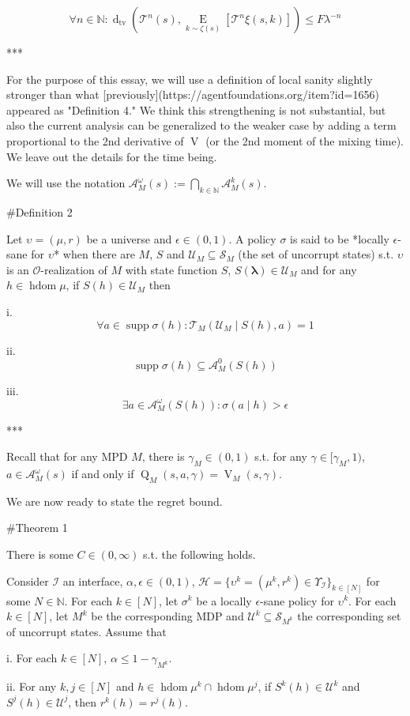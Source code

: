 \documentclass[a4paper]{article}
\DeclareMathOperator{\Supp}{supp}
\newcommand{\AP}[1]{\left(#1\right)}
\newcommand{\AB}[1]{\left[#1\right]}
\newcommand{\Ea}[2]{\underset{#1}{\operatorname{E}}\AB{#2}}
\newcommand{\Dtva}[1]{\operatorname{d}_{\text{tv}}\AP{#1}}
\newcommand{\Nats}{\mathbb{N}}
\newcommand{\Estr}{\boldsymbol{\lambda}}
\newcommand{\Ob}{\mathcal{O}}
\newcommand{\A}{\mathcal{A}}
\newcommand{\St}{\mathcal{S}}
\newcommand{\T}{\mathcal{T}}
\newcommand{\In}{\mathcal{I}}
\DeclareMathOperator{\HD}{hdom}
\newcommand{\Hy}{\mathcal{H}}
\newcommand{\UC}{\mathcal{U}}
\newcommand{\V}{\operatorname{V}}
\newcommand{\Q}{\operatorname{Q}}
\begin{document}
$$\forall n \in \Nats: \Dtva{\T^n(s),\Ea{k \sim \zeta(s)}{\T^n \xi(s,k)}} \leq F \lambda^{-n}$$

***

For the purpose of this essay, we will use a definition of local sanity slightly stronger than what [previously](https://agentfoundations.org/item?id=1656) appeared as "Definition 4." We think this strengthening is not substantial, but also the current analysis can be generalized to the weaker case by adding a term proportional to the 2nd derivative of $\V$ (or the 2nd moment of the mixing time). We leave out the details for the time being.

We will use the notation $\A_M^\omega(s):=\bigcap_{k\in\Nats} \A_M^k(s)$.

\#Definition 2

Let $\upsilon = (\mu,r)$ be a universe and $\epsilon \in (0,1)$. A policy $\sigma$ is said to be *locally $\epsilon$-sane for $\upsilon$* when there are $M$, $S$ and $\UC_M \subseteq \St_M$ (the set of uncorrupt states) s.t. $\upsilon$ is an $\Ob$-realization of $M$ with state function $S$, $S(\Estr) \in \UC_M$ and for any $h \in \HD{\mu}$, if $S(h) \in \UC_M$ then

i. $$\forall a \in \Supp{\sigma(h)}: \T_M\AP{\UC_M \mid S(h),a} = 1$$

ii. $$\Supp{\sigma(h)} \subseteq \A_M^0\left(S(h)\right)$$

iii. $$\exists a \in \A_M^\omega\AP{S(h)}: \sigma(a \mid h) > \epsilon$$

***

Recall that for any MPD $M$, there is $\gamma_M\in(0,1)$ s.t. for any $\gamma\in[\gamma_M,1)$, $a \in \A_M^\omega(s)$ if and only if $\Q_M(s,a,\gamma)=\V_M(s,\gamma)$.

We are now ready to state the regret bound.

\#Theorem 1

There is some $C \in (0,\infty)$ s.t. the following holds.

Consider $\In$ an interface, $\alpha,\epsilon \in (0,1)$, $\Hy = \{\upsilon^k = (\mu^k,r^k) \in \Upsilon_{\In}\}_{k \in [N]}$ for some $N \in \Nats$. For each $k \in [N]$, let $\sigma^k$ be a locally $\epsilon$-sane policy for $\upsilon^k$. For each $k \in [N]$, let $M^k$ be the corresponding MDP and $\UC^k \subseteq \St_{M^k}$ the corresponding set of uncorrupt states. Assume that 

i. For each $k \in [N]$, $\alpha \leq 1 - \gamma_{M^k}$.

ii. For any $k,j \in [N]$ and $h \in \HD{\mu^k} \cap \HD{\mu^j}$, if $S^k(h) \in \UC^k$ and $S^j(h) \in \UC^j$, then $r^k(h)=r^j(h)$. 
\end{document}
